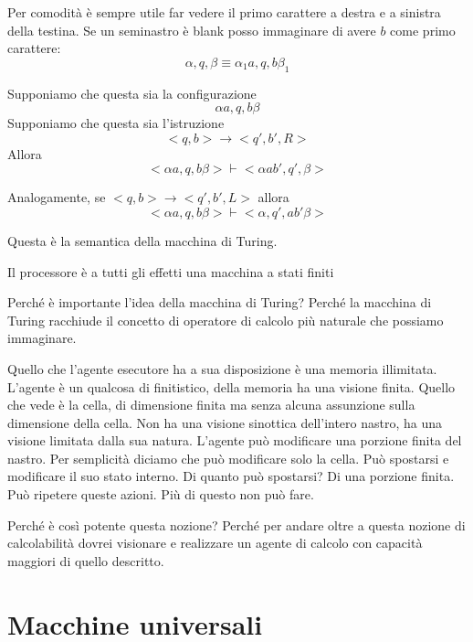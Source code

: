 Per comodità è sempre utile far vedere il primo carattere a destra e a sinistra della testina. Se
un seminastro è blank posso immaginare di avere $b$ come primo carattere:
\begin{equation*}
    \alpha,q,\beta \equiv \alpha_{1} a,q,b\beta_{1}
\end{equation*}

Supponiamo che questa sia la configurazione
\begin{equation*}
    \alpha a,q,b \beta
\end{equation*}
Supponiamo che questa sia l'istruzione
\begin{equation*}
    <q,b> \to <q',b',R>
\end{equation*}
Allora
\begin{equation*}
    <\alpha a,q,b \beta> \vdash <\alpha ab',q',\beta>
\end{equation*}

Analogamente, se $<q,b> \to <q',b',L>$ allora
\begin{equation*}
    <\alpha a,q,b \beta> \vdash <\alpha ,q',ab'\beta>
\end{equation*}

Questa è la semantica della macchina di Turing.

Il processore è a tutti gli effetti una macchina a stati finiti

Perché è importante l'idea della macchina di Turing? Perché la macchina di Turing racchiude il
concetto di operatore di calcolo più naturale che possiamo immaginare. 

Quello che l'agente esecutore ha a sua disposizione è una memoria illimitata. L'agente è un qualcosa
di finitistico, della memoria ha una visione finita. Quello che vede è la cella, di dimensione
finita ma senza alcuna assunzione sulla dimensione della cella. Non ha una visione sinottica
dell'intero nastro, ha una visione limitata dalla sua natura. L'agente può modificare una porzione
finita del nastro. Per semplicità diciamo che può modificare solo la cella.  Può spostarsi e
modificare il suo stato interno. Di quanto può spostarsi? Di una porzione finita. Può ripetere
queste azioni. Più di questo non può fare.

Perché è così potente questa nozione? Perché per andare oltre a questa nozione di calcolabilità
dovrei visionare e realizzare un agente di calcolo con capacità maggiori di quello descritto.

\section{Macchine universali}

